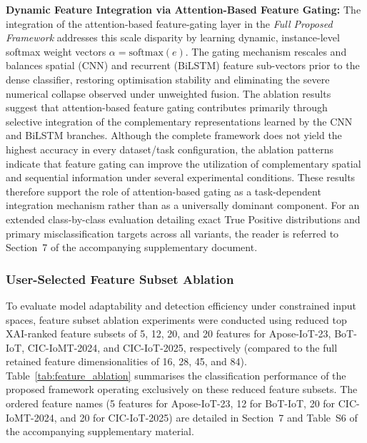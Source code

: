 \documentclass[a4paper,fleqn]{cas-sc}
\begin{document}
\begin{enumerate}
    {\color{blue}\item \textbf{Dynamic Feature Integration via Attention-Based Feature Gating:} The integration of the attention-based feature-gating layer in the \textit{Full Proposed Framework} addresses this scale disparity by learning dynamic, instance-level softmax weight vectors $\alpha = \text{softmax}(e)$. The gating mechanism rescales and balances spatial (CNN) and recurrent (BiLSTM) feature sub-vectors prior to the dense classifier, restoring optimisation stability and eliminating the severe numerical collapse observed under unweighted fusion. The ablation results suggest that attention-based feature gating contributes primarily through selective integration of the complementary representations learned by the CNN and BiLSTM branches. Although the complete framework does not yield the highest accuracy in every dataset/task configuration, the ablation patterns indicate that feature gating can improve the utilization of complementary spatial and sequential information under several experimental conditions. These results therefore support the role of attention-based gating as a task-dependent integration mechanism rather than as a universally dominant component. For an extended class-by-class evaluation detailing exact True Positive distributions and primary misclassification targets across all variants, the reader is referred to Section~7 of the accompanying supplementary document.}
\end{enumerate}

\subsubsection{User-Selected Feature Subset Ablation} \label{sec:feature_ablation}
To evaluate model adaptability and detection efficiency under constrained input spaces, feature subset ablation experiments were conducted using reduced top XAI-ranked feature subsets of 5, 12, 20, and 20 features for Apose-IoT-23, BoT-IoT, CIC-IoMT-2024, and CIC-IoT-2025, respectively (compared to the full retained feature dimensionalities of 16, 28, 45, and 84). Table~\ref{tab:feature_ablation} summarises the classification performance of the proposed framework operating exclusively on these reduced feature subsets. The ordered feature names (5 features for Apose-IoT-23, 12 for BoT-IoT, 20 for CIC-IoMT-2024, and 20 for CIC-IoT-2025) are detailed in Section~7 and Table~S6 of the accompanying supplementary material.
\end{document}
